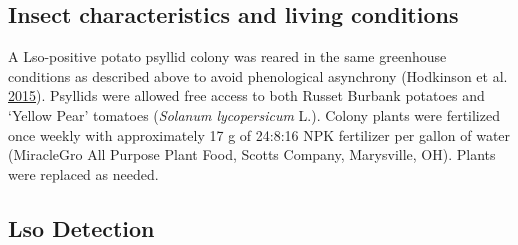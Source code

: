 \documentclass[]{article}
\begin{document}
\hypertarget{sec:insects}{%
\subsection{Insect characteristics and living
conditions}\label{sec:insects}}

A Lso-positive potato psyllid colony was reared in the same greenhouse
conditions as described above to avoid phenological asynchrony
(Hodkinson et al. \protect\hyperlink{ref-Hodkinson2015}{2015}). Psyllids
were allowed free access to both Russet Burbank potatoes and `Yellow
Pear' tomatoes (\emph{Solanum lycopersicum} L.). Colony plants were
fertilized once weekly with approximately 17 g of 24:8:16 NPK fertilizer
per gallon of water (MiracleGro All Purpose Plant Food, Scotts Company,
Marysville, OH). Plants were replaced as needed.

\hypertarget{sec:pcr}{%
\subsection{Lso Detection}\label{sec:pcr}}
\end{document}
